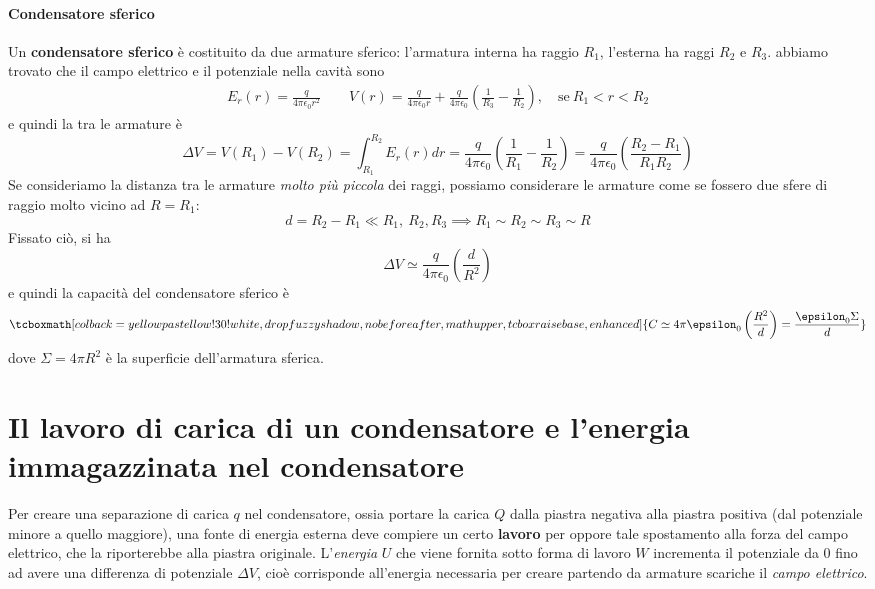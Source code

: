 \paragraph{Condensatore sferico}
Un \textbf{condensatore sferico} è costituito da due armature sferico: l'armatura interna ha raggio $R_1$, l'esterna ha raggi $R_2$ e $R_3$.
abbiamo trovato che il campo elettrico e il potenziale nella cavità sono%
\begin{align*}
	E_{r}(r)=\frac{q}{4\pi\epsilon_0r^2}\qquad
	V(r)=\frac{q}{4\pi\epsilon_0r}+\frac{q}{4\pi\epsilon_0}\left(\frac{1}{R_3}-\frac{1}{R_2}\right), \quad\text{se}\ R_1<r<R_2
\end{align*}
e quindi la \ddp tra le armature è
\begin{equation*}
	\Delta V=V(R_1)-V(R_2)=\int_{R_1}^{R_2}E_r(r)dr=\frac{q}{4\pi\epsilon_0}\left(\frac{1}{R_1}-\frac{1}{R_2}\right)=\frac{q}{4\pi\epsilon_0}\left(\frac{R_2-R_1}{R_1R_2}\right)
\end{equation*}
Se consideriamo la distanza tra le armature \textit{molto più piccola} dei raggi, possiamo considerare le armature come se fossero due sfere di raggio molto vicino ad $R=R_1$:
\begin{equation*}
	d=R_2-R_1\ll R_1,\ R_2, R_3\implies R_1\sim R_2\sim R_3\sim R
\end{equation*}
Fissato ciò, si ha
\begin{equation*}
	\Delta V\simeq\frac{q}{4\pi\epsilon_0}\left(\frac{d}{R^2}\right)
\end{equation*}
e quindi la capacità del condensatore sferico è
\begin{equation}
	\tcboxmath[colback=yellowpastellow!30!white,drop fuzzy shadow, nobeforeafter, math upper, tcbox raise base, enhanced]{C\simeq 4\pi\epsilon_0\left(\frac{R^2}{d}\right)=\frac{\epsilon_0\Sigma}{d}}
\end{equation}
dove $\Sigma=4\pi R^2$ è la superficie dell'armatura sferica.
\section{Il lavoro di carica di un condensatore e l'energia immagazzinata nel condensatore} %
Per creare una separazione di carica $q$ nel condensatore, ossia portare la carica $Q$ dalla piastra negativa alla piastra positiva (dal potenziale minore a quello maggiore), una fonte di energia esterna deve compiere un certo \textbf{lavoro} per oppore tale spostamento alla forza del campo elettrico, che la riporterebbe alla piastra originale. L'\textit{energia} $U$ che viene fornita sotto forma di lavoro $W$ incrementa il potenziale da $0$ fino ad avere una differenza di potenziale $\Delta V$, cioè corrisponde all'energia necessaria per creare partendo da armature scariche il \textit{campo elettrico}.

